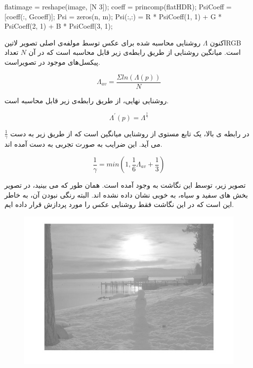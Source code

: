  \begin{code}
 \begin{matlab}
 	 flatimage = reshape(image, [N 3]);
 	 coeff = princomp(flatHDR);
 	 PsiCoeff = [coeff(:, Gcoeff)];
 	 Psi = zeros(n, m);
 	 Psi(:,:) = R * PsiCoeff(1, 1) + G * PsiCoeff(2, 1) + B * PsiCoeff(3, 1);
 \end{matlab}
 \end{code}


اکنون $\Lambda$ روشنایی محاسبه شده برای عکس توسط مولفه‌ی اصلی تصویر
‌لاتین{RGB }
است. میانگین روشنایی از طریق رابطه‌ی زیر قابل محاسبه است که در آن $N$ تعداد پیکسل‌های موجود در تصویراست.

\begin{equation}
	\Lambda_{av} = \frac{\varSigma ln(\Lambda(p))}{N}
\end{equation}

روشنایی نهایی، از طریق رابطه‌ی زیر قابل محاسبه است.

\begin{equation}
	\Lambda^{'}(p) = \Lambda^{\frac{1}{\gamma}}	
\end{equation}

$\frac{1}{\gamma}$
در رابطه ی بالا،  یک تابع مستوی از  روشنایی میانگین است که از طریق زیر به دست می آید. این ضرایب به صورت تجربی به دست آمده اند.

\begin{equation}
	\frac{1}{\gamma} = min(1, \frac{1}{6} \Lambda_{av} + \frac{1}{3})
\end{equation}

تصویر زیر، توسط این نگاشت به وجود آمده است. همان طور که می بینید، در تصویر بخش های سفید و سیاه، به خوبی نشان داده نشده اند. البته رنگی نبودن آن، به خاطر این است که در این نگاشت فقط روشنایی عکس را مورد پردازش قرار داده ایم.

 
 \begin{figure}[!htb]
 		\includegraphics[width=\linewidth]{images/retinexglobal}
 		\caption{}\label{fig:logtonemap}
 		\endminipage\hfill
 \end{figure}
 
